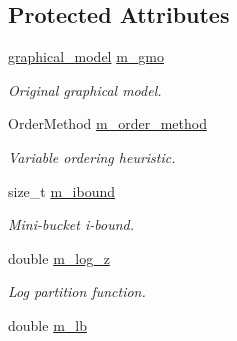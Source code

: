 \subsection*{Protected Attributes}
\begin{DoxyCompactItemize}
\item 
\hypertarget{classmerlin_1_1jglp_ac0f668e6d434179145bfb10afce53938}{}\hyperlink{classmerlin_1_1graphical__model}{graphical\+\_\+model} \hyperlink{classmerlin_1_1jglp_ac0f668e6d434179145bfb10afce53938}{m\+\_\+gmo}\label{classmerlin_1_1jglp_ac0f668e6d434179145bfb10afce53938}

\begin{DoxyCompactList}\small\item\em Original graphical model. \end{DoxyCompactList}\item 
\hypertarget{classmerlin_1_1jglp_a406bdf7a6e931ff40a7c0a0ddcf8d099}{}Order\+Method \hyperlink{classmerlin_1_1jglp_a406bdf7a6e931ff40a7c0a0ddcf8d099}{m\+\_\+order\+\_\+method}\label{classmerlin_1_1jglp_a406bdf7a6e931ff40a7c0a0ddcf8d099}

\begin{DoxyCompactList}\small\item\em Variable ordering heuristic. \end{DoxyCompactList}\item 
\hypertarget{classmerlin_1_1jglp_a06d2c5e9d89c5af6e21ded02eaf3222b}{}size\+\_\+t \hyperlink{classmerlin_1_1jglp_a06d2c5e9d89c5af6e21ded02eaf3222b}{m\+\_\+ibound}\label{classmerlin_1_1jglp_a06d2c5e9d89c5af6e21ded02eaf3222b}

\begin{DoxyCompactList}\small\item\em Mini-\/bucket i-\/bound. \end{DoxyCompactList}\item 
\hypertarget{classmerlin_1_1jglp_afb663294d5593789c47985869b36bd48}{}double \hyperlink{classmerlin_1_1jglp_afb663294d5593789c47985869b36bd48}{m\+\_\+log\+\_\+z}\label{classmerlin_1_1jglp_afb663294d5593789c47985869b36bd48}

\begin{DoxyCompactList}\small\item\em Log partition function. \end{DoxyCompactList}\item 
\hypertarget{classmerlin_1_1jglp_aa64d901abe0f4d02f144460323a386b4}{}double \hyperlink{classmerlin_1_1jglp_aa64d901abe0f4d02f144460323a386b4}{m\+\_\+lb}\label{classmerlin_1_1jglp_aa64d901abe0f4d02f144460323a386b4}


\end{DoxyCompactItemize}
